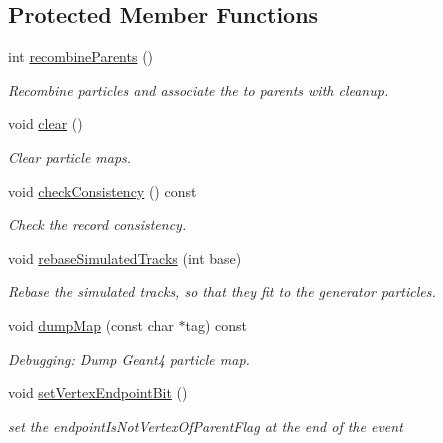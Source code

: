 \subsection*{Protected Member Functions}
\begin{DoxyCompactItemize}
\item 
int \hyperlink{class_d_d4hep_1_1_simulation_1_1_geant4_particle_handler_a828738c3b9ec35cff6ea6fc659b6df4a}{recombineParents} ()
\begin{DoxyCompactList}\small\item\em Recombine particles and associate the to parents with cleanup. \item\end{DoxyCompactList}\item 
void \hyperlink{class_d_d4hep_1_1_simulation_1_1_geant4_particle_handler_a3d3d90e1e70f18337199c27da300c75d}{clear} ()
\begin{DoxyCompactList}\small\item\em Clear particle maps. \item\end{DoxyCompactList}\item 
void \hyperlink{class_d_d4hep_1_1_simulation_1_1_geant4_particle_handler_ae3ea53c5a352ce4a18785a7e34a5ce53}{checkConsistency} () const 
\begin{DoxyCompactList}\small\item\em Check the record consistency. \item\end{DoxyCompactList}\item 
void \hyperlink{class_d_d4hep_1_1_simulation_1_1_geant4_particle_handler_a27443ebbf322d022c1dc8337e02f089b}{rebaseSimulatedTracks} (int base)
\begin{DoxyCompactList}\small\item\em Rebase the simulated tracks, so that they fit to the generator particles. \item\end{DoxyCompactList}\item 
void \hyperlink{class_d_d4hep_1_1_simulation_1_1_geant4_particle_handler_a4bf2afae6d47cd578f8cbccbbc765e25}{dumpMap} (const char $\ast$tag) const 
\begin{DoxyCompactList}\small\item\em Debugging: Dump Geant4 particle map. \item\end{DoxyCompactList}\item 
void \hyperlink{class_d_d4hep_1_1_simulation_1_1_geant4_particle_handler_a1e75f073fa789609d31025fa7af977e8}{setVertexEndpointBit} ()
\begin{DoxyCompactList}\small\item\em set the endpointIsNotVertexOfParentFlag at the end of the event \item\end{DoxyCompactList}\end{DoxyCompactItemize}
